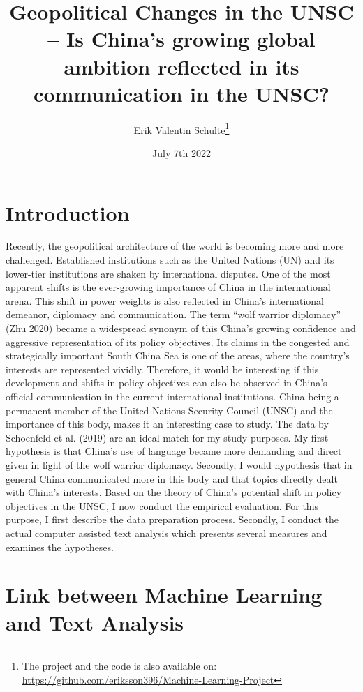 \documentclass[
]{article}
\title{Geopolitical Changes in the UNSC -- Is China's growing global
ambition reflected in its communication in the UNSC?}
\author{Erik Valentin Schulte\footnote{The project and the code is also
  available on:
  \url{https://github.com/eriksson396/Machine-Learning-Project}}}
\date{July 7th 2022}
\begin{document}
\maketitle

\hypertarget{introduction}{%
\section{\texorpdfstring{Introduction
\label{Introduction}}{Introduction }}\label{introduction}}

Recently, the geopolitical architecture of the world is becoming more
and more challenged. Established institutions such as the United Nations
(UN) and its lower-tier institutions are shaken by international
disputes. One of the most apparent shifts is the ever-growing importance
of China in the international arena. This shift in power weights is also
reflected in China's international demeanor, diplomacy and
communication. The term ``wolf warrior diplomacy'' (Zhu 2020) became a
widespread synonym of this China's growing confidence and aggressive
representation of its policy objectives. Its claims in the congested and
strategically important South China Sea is one of the areas, where the
country's interests are represented vividly. Therefore, it would be
interesting if this development and shifts in policy objectives can also
be observed in China's official communication in the current
international institutions. China being a permanent member of the United
Nations Security Council (UNSC) and the importance of this body, makes
it an interesting case to study. The data by Schoenfeld et al. (2019)
are an ideal match for my study purposes. My first hypothesis is that
China's use of language became more demanding and direct given in light
of the wolf warrior diplomacy. Secondly, I would hypothesis that in
general China communicated more in this body and that topics directly
dealt with China's interests. Based on the theory of China's potential
shift in policy objectives in the UNSC, I now conduct the empirical
evaluation. For this purpose, I ﬁrst describe the data preparation
process. Secondly, I conduct the actual computer assisted text analysis
which presents several measures and examines the hypotheses.

\hypertarget{link-between-machine-learning-and-text-analysis}{%
\section{Link between Machine Learning and Text
Analysis}\label{link-between-machine-learning-and-text-analysis}}
\end{document}
